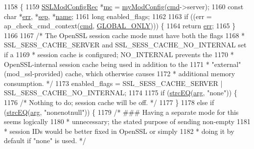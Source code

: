 \begin{DoxyCode}
1158 \{
1159     \hyperlink{structSSLModConfigRec}{SSLModConfigRec} *\hyperlink{group__APR__Util__MC_ga1cf8c9d89cfb411f224cae715e8c2aaa}{mc} = \hyperlink{group__MOD__SSL__PRIVATE_ga94fd702ebef715ed37309b2be90c68e8}{myModConfig}(\hyperlink{group__APACHE__CORE__DAEMON_ga504a7f40c3261db3e10e1d2776642dd6}{cmd}->server);
1160     \textcolor{keyword}{const} \textcolor{keywordtype}{char} *\hyperlink{group__AP__EXPR_gaccebe6c638c552d2845014cf8bdea8d8}{err}, *\hyperlink{group__apr__strings_ga0234c8660bac5d4b5e016b1e715aed77}{sep}, *\hyperlink{group__APACHE__CORE__CONFIG_ga06e97fb366205b8f170da3c7562a8677}{name};
1161     \textcolor{keywordtype}{long} enabled\_flags;
1162 
1163     \textcolor{keywordflow}{if} ((err = ap\_check\_cmd\_context(\hyperlink{group__APACHE__CORE__DAEMON_ga504a7f40c3261db3e10e1d2776642dd6}{cmd}, \hyperlink{group__ap__check__cmd__context_ga8f2f401b1d57a151c5ba871088ba097e}{GLOBAL\_ONLY}))) \{
1164         \textcolor{keywordflow}{return} \hyperlink{group__AP__EXPR_gaccebe6c638c552d2845014cf8bdea8d8}{err};
1165     \}
1166 
1167     \textcolor{comment}{/* The OpenSSL session cache mode must have both the flags}
1168 \textcolor{comment}{     * SSL\_SESS\_CACHE\_SERVER and SSL\_SESS\_CACHE\_NO\_INTERNAL set if a}
1169 \textcolor{comment}{     * session cache is configured; NO\_INTERNAL prevents the}
1170 \textcolor{comment}{     * OpenSSL-internal session cache being used in addition to the}
1171 \textcolor{comment}{     * "external" (mod\_ssl-provided) cache, which otherwise causes}
1172 \textcolor{comment}{     * additional memory consumption. */}
1173     enabled\_flags = SSL\_SESS\_CACHE\_SERVER | SSL\_SESS\_CACHE\_NO\_INTERNAL;
1174 
1175     \textcolor{keywordflow}{if} (\hyperlink{mod__nw__ssl_8c_a8c9b1bea39b1e4f8b9ecad58e16b6e71}{strcEQ}(\hyperlink{group__APACHE__CORE__LISTEN_ga71f9d4c76ff7cd8f3db5697a5cfa7b08}{arg}, \textcolor{stringliteral}{"none"})) \{
1176         \textcolor{comment}{/* Nothing to do; session cache will be off. */}
1177     \}
1178     \textcolor{keywordflow}{else} \textcolor{keywordflow}{if} (\hyperlink{mod__nw__ssl_8c_a8c9b1bea39b1e4f8b9ecad58e16b6e71}{strcEQ}(\hyperlink{group__APACHE__CORE__LISTEN_ga71f9d4c76ff7cd8f3db5697a5cfa7b08}{arg}, \textcolor{stringliteral}{"nonenotnull"})) \{
1179         \textcolor{comment}{/* ### Having a separate mode for this seems logically}
1180 \textcolor{comment}{         * unnecessary; the stated purpose of sending non-empty}
1181 \textcolor{comment}{         * session IDs would be better fixed in OpenSSL or simply}
1182 \textcolor{comment}{         * doing it by default if "none" is used. */}

\end{DoxyCode}

